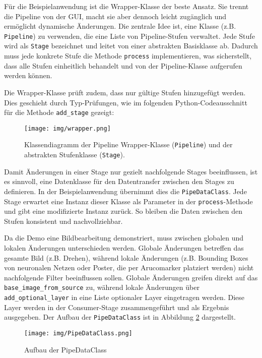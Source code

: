 \documentclass[a4paper]{article} %
\begin{document}
Für die Beispielanwendung ist die Wrapper-Klasse der beste Ansatz. Sie trennt die Pipeline von der GUI, macht sie aber dennoch leicht zugänglich und ermöglicht dynamische Änderungen. Die zentrale Idee ist, eine Klasse (z.B. \texttt{Pipeline}) zu verwenden, die eine Liste von Pipeline-Stufen verwaltet. Jede Stufe wird als \texttt{Stage} bezeichnet und leitet von einer abstrakten Basisklasse ab. Dadurch muss jede konkrete Stufe die Methode \texttt{process} implementieren, was sicherstellt, dass alle Stufen einheitlich behandelt und von der Pipeline-Klasse aufgerufen werden können.

Die Wrapper-Klasse prüft zudem, dass nur gültige Stufen hinzugefügt werden. Dies geschieht durch Typ-Prüfungen, wie im folgenden Python-Codeausschnitt für die Methode \texttt{add\_stage} gezeigt:

\begin{figure}[htbp]
    \centering
    \texttt{[image: img/wrapper.png]}
    \caption{Klassendiagramm der Pipeline Wrapper-Klasse (\texttt{Pipeline}) und der abstrakten Stufenklasse (\texttt{Stage}).}
    \label{fig:wrapper}
\end{figure}

Damit Änderungen in einer Stage nur gezielt nachfolgende Stages beeinflussen, ist es sinnvoll, eine Datenklasse für den Datentransfer zwischen den Stages zu definieren. In der Beispielanwendung übernimmt dies die \texttt{PipeDataClass}. Jede Stage erwartet eine Instanz dieser Klasse als Parameter in der \texttt{process}-Methode und gibt eine modifizierte Instanz zurück. So bleiben die Daten zwischen den Stufen konsistent und nachvollziehbar.

Da die Demo eine Bildbearbeitung demonstriert, muss zwischen globalen und lokalen Änderungen unterschieden werden. Globale Änderungen betreffen das gesamte Bild (z.B. Drehen), während lokale Änderungen (z.B. Bounding Boxes von neuronalen Netzen oder Poster, die per Arucomarker platziert werden) nicht nachfolgende Filter beeinflussen sollen. Globale Änderungen greifen direkt auf das \texttt{base\_image\_from\_source} zu, während lokale Änderungen über \texttt{add\_optional\_layer} in eine Liste optionaler Layer eingetragen werden. Diese Layer werden in der Consumer-Stage zusammengeführt und als Ergebnis ausgegeben. Der Aufbau der \texttt{PipeDataClass} ist in Abbildung \ref{fig:pipeDataClass} dargestellt.

\begin{figure}[htbp]
    \centering
    \texttt{[image: img/PipeDataClass.png]}
    \caption{Aufbau der PipeDataClass}
    \label{fig:pipeDataClass}
\end{figure}
\end{document}
